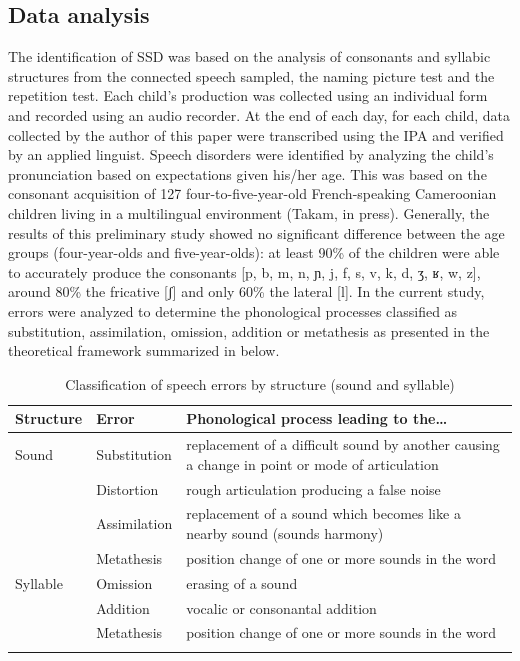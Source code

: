 \documentclass[output=paper,newtxmath,modfonts,nonflat,draftmode]{langsci/langscibook}
\begin{document}
\subsection{Data analysis} %

The identification of SSD was based on the analysis of consonants and syllabic structures from the connected speech sampled, the naming picture test and the repetition test. Each child’s production was collected using an individual form and recorded using an audio recorder. At the end of each day, for each child, data collected by the author of this paper were transcribed using the IPA and verified by an applied linguist. Speech disorders were identified by analyzing the child’s pronunciation based on expectations given his/her age. This was based on the consonant acquisition of 127 four-to-five-year-old French-speaking Cameroonian children living in a multilingual environment (Takam, in press). Generally, the results of this preliminary study showed no significant difference between the age groups (four-year-olds and five-year-olds): at least 90\% of the children were able to accurately produce the consonants [p, b, m, n, ɲ, j, f, s, v, k, d, ʒ, ʁ, w, z], around 80\% the fricative [ʃ] and only 60\% the lateral [l]. In the current study, errors were analyzed to determine the phonological processes classified as substitution, assimilation, omission, addition or metathesis as presented in the theoretical framework summarized in  below. 

\begin{table}
\caption{Classification of speech errors by structure (sound and syllable)}
\begin{tabularx}{\textwidth}{llQ}
\lsptoprule
{Structure}  & {Error}  & {Phonological} {process} {leading} {to} {the…}\\
\midrule
Sound & Substitution & replacement of a difficult sound by another causing a change in point or mode of articulation\\
\tablevspace
& Distortion & rough articulation producing a false noise\\
\tablevspace
& Assimilation & replacement of a sound which becomes like a nearby sound (sounds harmony)\\
\tablevspace
& Metathesis & position change of one or more sounds in the word\\
\tablevspace
Syllable & Omission & erasing of a sound\\
\tablevspace
& Addition & vocalic or consonantal addition\\
\tablevspace
& Metathesis & position change of one or more sounds in the word\\
\lspbottomrule
\end{tabularx}
\label{tab:takam:2}
\end{table}
\end{document}
